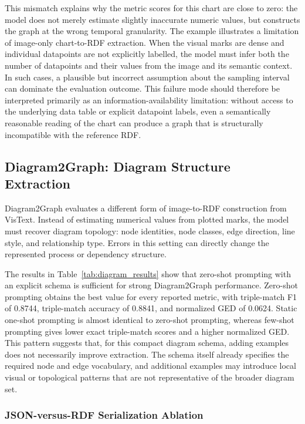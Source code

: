 \documentclass[preprint,12pt]{elsarticle}
\begin{document}
This mismatch explains why the metric scores for this chart are close to zero:
the model does not merely estimate slightly inaccurate numeric values, but
constructs the graph at the wrong temporal granularity. The example illustrates
a limitation of image-only chart-to-RDF extraction. When the visual marks are
dense and individual datapoints are not explicitly labelled, the model must
infer both the number of datapoints and their values from the image and its
semantic context. In such cases, a plausible but incorrect assumption about the
sampling interval can dominate the evaluation outcome. This failure mode should
therefore be interpreted primarily as an information-availability limitation:
without access to the underlying data table or explicit datapoint labels, even a
semantically reasonable reading of the chart can produce a graph that is
structurally incompatible with the reference RDF.


\subsection{Diagram2Graph: Diagram Structure Extraction}

Diagram2Graph evaluates a different form of image-to-RDF construction from VisText. Instead of estimating numerical values from plotted marks, the model must recover diagram topology: node identities, node classes, edge direction, line style, and relationship type. Errors in this setting can directly change the represented process or dependency structure.

The results in Table~\ref{tab:diagram_results} show that zero-shot prompting with an explicit schema is sufficient for strong Diagram2Graph performance. Zero-shot prompting obtains the best value for every reported metric, with triple-match F1 of 0.8744, triple-match accuracy of 0.8841, and normalized GED of 0.0624. Static one-shot prompting is almost identical to zero-shot prompting, whereas few-shot prompting gives lower exact triple-match scores and a higher normalized GED. This pattern suggests that, for this compact diagram schema, adding examples does not necessarily improve extraction. The schema itself already specifies the required node and edge vocabulary, and additional examples may introduce local visual or topological patterns that are not representative of the broader diagram set.

\subsubsection{JSON-versus-RDF Serialization Ablation}
\end{document}
